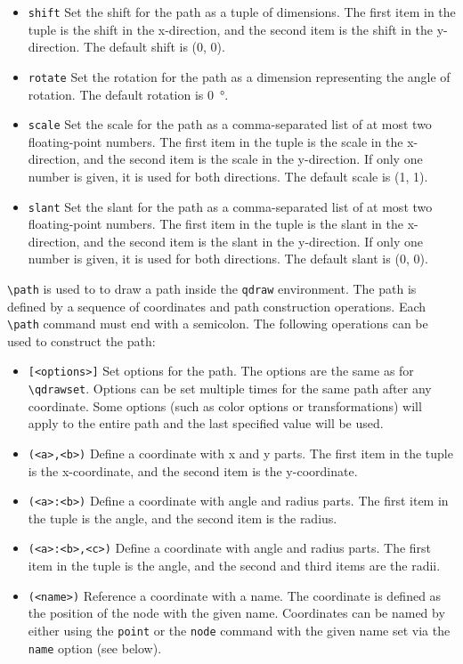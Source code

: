\documentclass{article}
\begin{document}
\begin{itemize}
    \item \verb|shift| Set the shift for the path as a tuple of dimensions. The first item in the tuple is the shift in the x-direction, and the second item is the shift in the y-direction. The default shift is (\qty{0}{\point}, \qty{0}{\point}).
    \item \verb|rotate| Set the rotation for the path as a dimension representing the angle of rotation. The default rotation is \qty{0}{\degree}.
    \item \verb|scale| Set the scale for the path as a comma-separated list of at most two floating-point numbers. The first item in the tuple is the scale in the x-direction, and the second item is the scale in the y-direction. If only one number is given, it is used for both directions. The default scale is (\num{1}, \num{1}).
    \item \verb|slant| Set the slant for the path as a comma-separated list of at most two floating-point numbers. The first item in the tuple is the slant in the x-direction, and the second item is the slant in the y-direction. If only one number is given, it is used for both directions. The default slant is (\num{0}, \num{0}).
\end{itemize}


\verb|\path| is used to to draw a path inside the \verb|qdraw| environment. The path is defined by a sequence of coordinates and path construction operations. Each \verb|\path| command must end with a semicolon. The following operations can be used to construct the path:

\begin{itemize}
    \item \verb|[<options>]| Set options for the path. The options are the same as for \verb|\qdrawset|. Options can be set multiple times for the same path after any coordinate. Some options (such as color options or transformations) will apply to the entire path and the last specified value will be used.
    \item \verb|(<a>,<b>)| Define a coordinate with x and y parts. The first item in the tuple is the x-coordinate, and the second item is the y-coordinate.
    \item \verb|(<a>:<b>)| Define a coordinate with angle and radius parts. The first item in the tuple is the angle, and the second item is the radius.
    \item \verb|(<a>:<b>,<c>)| Define a coordinate with angle and radius parts. The first item in the tuple is the angle, and the second and third items are the radii.
    \item \verb|(<name>)| Reference a coordinate with a name. The coordinate is defined as the position of the node with the given name. Coordinates can be named by either using the \verb|point| or the \verb|node| command with the given name set via the \verb|name| option (see below).
\end{itemize}
\end{document}
